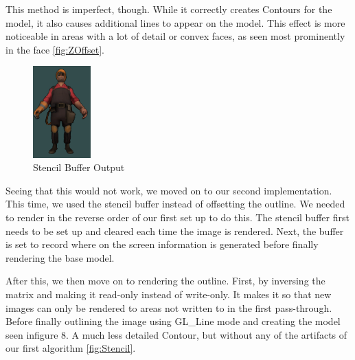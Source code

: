This method is imperfect, though. While it correctly creates Contours for the model, it also causes 
additional lines to appear on the model. This effect is more noticeable in areas with a lot of detail or 
convex faces, as seen most prominently in the face \autoref{fig:ZOffset}.

\begin{figure}[h]
    \centering
    \includegraphics[height=100pt]{img/ModelD.png}
    \caption{Stencil Buffer Output}
    \label{fig:Stencil}
\end{figure}

Seeing that this would not work, we moved on to our second implementation. This time, we used the stencil 
buffer instead of offsetting the outline. We needed to render in the reverse order of our first set up to 
do this. The stencil buffer first needs to be set up and cleared each time the image is rendered. Next, 
the buffer is set to record where on the screen information is generated before finally rendering the base model.

After this, we then move on to rendering the outline. First, by inversing the matrix and making it read-only 
instead of write-only. It makes it so that new images can only be rendered to areas not written to in the 
first pass-through. Before finally outlining the image using GL\_Line mode and creating the model seen infigure 
8. A much less detailed Contour, but without any of the artifacts of our first algorithm \autoref{fig:Stencil}.

\newpage
{}

